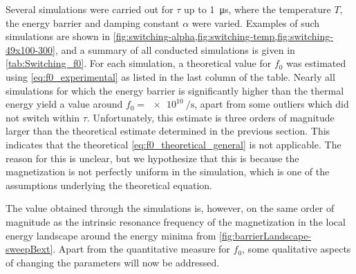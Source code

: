 \documentclass[11pt,a4paper,english,twoside]{article}
\begin{document}
Several simulations were carried out for $\tau$ up to \SI{1}{\micro\second}, where the temperature $T$, the energy barrier and damping constant $\alpha$ were varied. Examples of such simulations are shown in \cref{fig:switching-alpha,fig:switching-temp,fig:switching-49x100-300}, and a summary of all conducted simulations is given in \cref{tab:Switching_f0}. For each simulation, a theoretical value for $f_0$ was estimated using \cref{eq:f0_experimental} as listed in the last column of the table. 
Nearly all simulations for which the energy barrier is significantly higher than the thermal energy yield a value around $f_0=\SI{e10}{\per\second}$, apart from some outliers which did not switch within $\tau$. Unfortunately, this estimate is three orders of magnitude larger than the theoretical estimate determined in the previous section. This indicates that the theoretical \cref{eq:f0_theoretical_general} is not applicable. The reason for this is unclear, but we hypothesize that this is because the magnetization is not perfectly uniform in the simulation, which is one of the assumptions underlying the theoretical equation. \par
The value obtained through the simulations is, however, on the same order of magnitude as the intrinsic resonance frequency of the magnetization in the local energy landscape around the energy minima from \cref{fig:barrierLandscape-sweepBext}.
Apart from the quantitative measure for $f_0$, some qualitative aspects of changing the parameters will now be addressed.
\end{document}
